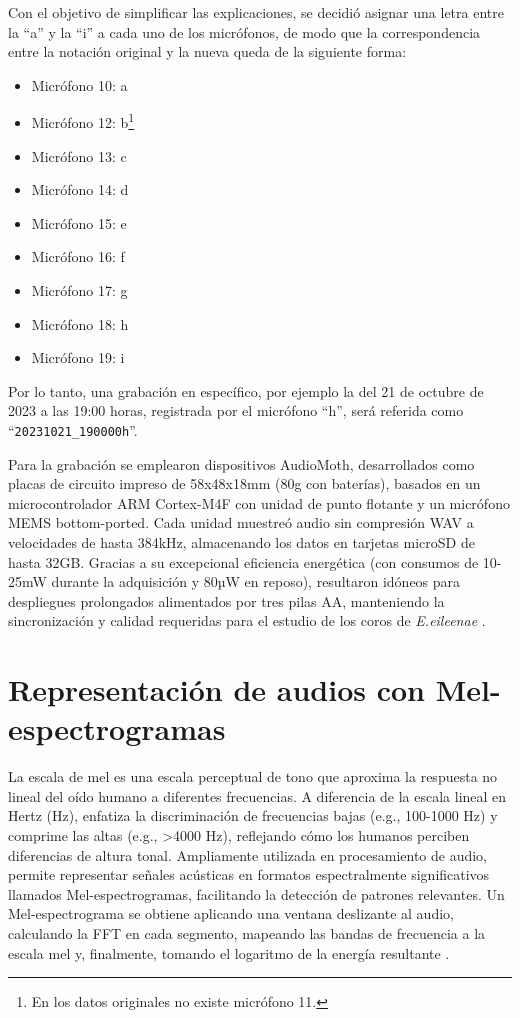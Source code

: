 Con el objetivo de simplificar las explicaciones, se decidió 
asignar una letra entre la “a” y la “i” a cada uno de los micrófonos,
de modo que la correspondencia entre la notación original y la nueva 
queda de la siguiente forma:
\begin{itemize}
    \item Micrófono 10: a
    \item Micrófono 12: b\footnote{En los datos originales no existe micrófono 11.}
    \item Micrófono 13: c
    \item Micrófono 14: d
    \item Micrófono 15: e
    \item Micrófono 16: f
    \item Micrófono 17: g
    \item Micrófono 18: h
    \item Micrófono 19: i
\end{itemize}

Por lo tanto, una grabación en específico, por ejemplo la del 21 de octubre de 2023 a las 
19:00 horas, registrada por el micrófono “h”, será referida como “\texttt{20231021\_190000h}”.

Para la grabación se emplearon dispositivos AudioMoth, 
desarrollados como placas de circuito impreso de 58x48x18mm 
(80g con baterías), basados en un microcontrolador ARM 
Cortex-M4F con unidad de punto flotante y un micrófono MEMS 
bottom-ported. Cada unidad muestreó audio sin compresión WAV a 
velocidades de hasta 384kHz, almacenando los datos en tarjetas 
microSD de hasta 32GB. Gracias a su excepcional eficiencia 
energética (con consumos de 10-25mW durante la adquisición y 
80µW en reposo), 
resultaron idóneos para despliegues prolongados alimentados por 
tres pilas AA, manteniendo la sincronización y calidad 
requeridas para el estudio de los coros de \emph{E.eileenae} \cite{hill2018audiomoth}.


\section{Representación de audios con Mel-espectrogramas}
\label{sec:mel_spectrogramas}

La escala de mel es una escala perceptual de tono que aproxima la 
respuesta no lineal del oído humano a diferentes frecuencias. A 
diferencia de la escala lineal en Hertz (Hz), enfatiza la 
discriminación de frecuencias bajas (e.g., 100-1000 Hz) y 
comprime las altas (e.g., >4000 Hz), reflejando cómo los humanos 
perciben diferencias de altura tonal. Ampliamente utilizada en 
procesamiento de audio, permite representar señales acústicas 
en formatos espectralmente significativos llamados Mel-espectrogramas, 
facilitando la detección de patrones relevantes. \cite{zhang2021acoustic}
Un Mel-espectrograma se obtiene aplicando una ventana 
deslizante al audio, calculando la FFT en cada segmento, mapeando las bandas de 
frecuencia a la escala mel y, finalmente, tomando el logaritmo 
de la energía resultante \cite{zhang2021acoustic}. 

